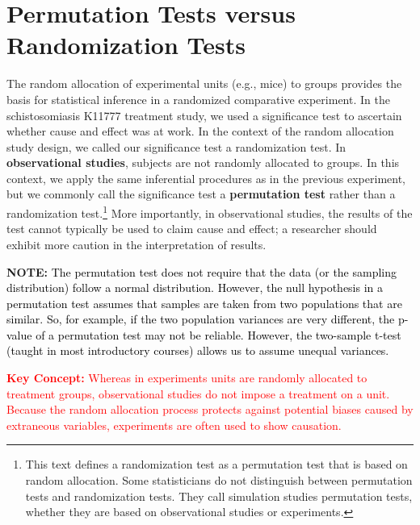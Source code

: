 \documentclass[
]{report}
\theoremstyle{definition}
\theoremstyle{definition}
\theoremstyle{definition}
\theoremstyle{definition}
\theoremstyle{remark}
\begin{document}
\hypertarget{permutation-tests-versus-randomization-tests}{%
\section{\texorpdfstring{\textbf{Permutation Tests versus Randomization Tests}}{Permutation Tests versus Randomization Tests}}\label{permutation-tests-versus-randomization-tests}}

The random allocation of experimental units (e.g., mice) to groups provides the basis for statistical inference in
a randomized comparative experiment. In the schistosomiasis K11777 treatment study, we used a significance
test to ascertain whether cause and effect was at work. In the context of the random allocation study design,
we called our significance test a randomization test.
\textbar{} In \textbf{observational studies}, subjects are not randomly allocated to groups. In this context, we apply the
same inferential procedures as in the previous experiment, but we commonly call the significance test a
\textbf{permutation test} rather than a randomization test.\footnote{This text defines a randomization test as a permutation test that is based on random allocation. Some statisticians do not
  distinguish between permutation tests and randomization tests. They call simulation studies permutation tests, whether
  they are based on observational studies or experiments.} More importantly, in observational studies, the results
of the test cannot typically be used to claim cause and effect; a researcher should exhibit more caution in the
interpretation of results.

\large

\textbf{NOTE:}
\textcolor{black}{The permutation test does not require that the data (or the sampling distribution) follow a normal distribution.
However, the null hypothesis in a permutation test assumes that samples are taken from two populations
that are similar. So, for example, if the two population variances are very different, the p-value of a
permutation test may not be reliable. However, the two-sample t-test (taught in most introductory courses)
allows us to assume unequal variances.}

\Large

\textbf{\textcolor{red}{Key Concept:}}
\textcolor{red}{Whereas in experiments units are randomly allocated to treatment groups, observational studies do not
impose a treatment on a unit. Because the random allocation process protects against potential biases
caused by extraneous variables, experiments are often used to show causation.}
\end{document}
